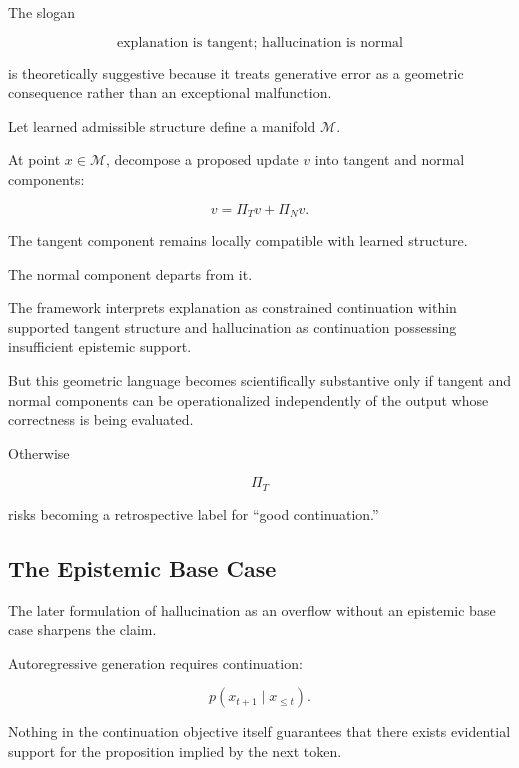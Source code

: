 \documentclass[11pt]{article}
\theoremstyle{remark}
\begin{document}
The slogan

\begin{equation}
\text{explanation is tangent; hallucination is normal}
\end{equation}

is theoretically suggestive because it treats generative error as a geometric consequence rather than an exceptional malfunction.

Let learned admissible structure define a manifold $\mathcal{M}$.

At point $x\in\mathcal{M}$, decompose a proposed update $v$ into tangent and normal components:

\begin{equation}
v
=
\Pi_T v
+
\Pi_N v.
\end{equation}

The tangent component remains locally compatible with learned structure.

The normal component departs from it.

The framework interprets explanation as constrained continuation within supported tangent structure and hallucination as continuation possessing insufficient epistemic support.

But this geometric language becomes scientifically substantive only if tangent and normal components can be operationalized independently of the output whose correctness is being evaluated.

Otherwise

\begin{equation}
\Pi_T
\end{equation}

risks becoming a retrospective label for ``good continuation.''

\subsection{The Epistemic Base Case}

The later formulation of hallucination as an overflow without an epistemic base case sharpens the claim.

Autoregressive generation requires continuation:

\begin{equation}
p(x_{t+1}\mid x_{\leq t}).
\end{equation}

Nothing in the continuation objective itself guarantees that there exists evidential support for the proposition implied by the next token.
\end{document}
